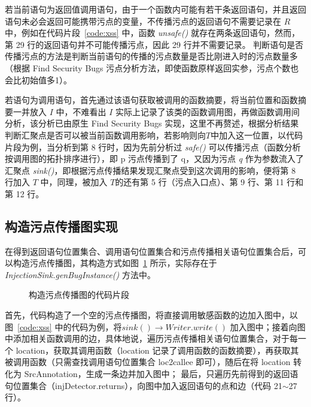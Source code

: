 若当前语句为返回值调用语句，由于一个函数内可能有若干条返回语句，并且返回语句未必会返回可能携带污点的变量，不传播污点的返回语句不需要记录在 $R$ 中，例如在代码片段~\ref{code:xss} 中，函数 \textit{unsafe()} 就存在两条返回语句，然而，第 29 行的返回语句并不可能传播污点，因此 29 行并不需要记录。 判断语句是否传播污点的方法是判断当前语句的传播的污点数量是否比刚进入时的污点数量多（根据 Find Security Bugs 污点分析方法，即使函数原样返回实参，污点个数也会比初始值多1）。

若语句为调用语句，首先通过该语句获取被调用的函数摘要，将当前位置和函数摘要一并放入 $I$ 中，不难看出 $I$ 实际上记录了该类的函数调用图，再做函数调用间分析，该分析已由原生 Find Security Bugs 实现，这里不再赘述，根据分析结果判断汇聚点是否可以被当前函数调用影响，若影响则向$T$中加入这一位置，以代码片段为例，当分析到第 8 行时，因为先前分析过 \textit{safe()} 可以传播污点（函数分析按调用图的拓扑排序进行），即 p 污点传播到了 q，又因为污点 \textit{q} 作为参数流入了汇聚点 \textit{sink()}，即根据污点传播结果发现汇聚点受到这次调用的影响，便将第 8 行加入 $T$ 中，同理，被加入 $T$的还有第 5 行（污点入口点）、第 9 行、第 11 行和第 12 行。

\subsection{构造污点传播图实现}
在得到返回语句位置集合、调用语句位置集合和污点传播相关语句位置集合后，可以构造污点传播图，其构造方式如图~\ref{code:taintGraph} 所示，实际存在于 \textit{InjectionSink.genBugInstance()} 方法中。

\begin{figure}[!htbp]
    \centering
    \begin{minipage}[!htbp]{0.9\textwidth}
        
    \end{minipage}
    \caption{构造污点传播图的代码片段}\label{code:taintGraph}
\end{figure}

首先，代码构造了一个空的污点传播图，将直接调用敏感函数的边加入图中，以图~\ref{code:xss} 中的代码为例，将$sink() \rightarrow Writer.write()$ 加入图中；接着向图中添加相关函数调用的边，具体地说，遍历污点传播相关语句位置集合，对于每一个 location，获取其调用函数（location 记录了调用函数的函数摘要），再获取其被调用函数（只需查找调用语句位置集合 loc2callee 即可），随后在将 location 转化为 SrcAnnotation，生成一条边并加入图中； 最后，只遍历先前得到的返回语句位置集合（injDetector.returns），向图中加入返回语句的点和边（代码 21$\sim$27 行）。

